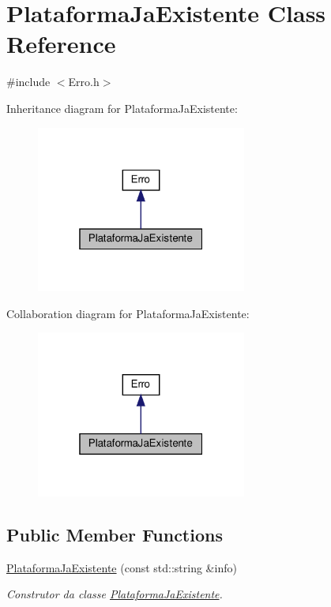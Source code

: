 \hypertarget{classPlataformaJaExistente}{}\section{Plataforma\+Ja\+Existente Class Reference}
\label{classPlataformaJaExistente}


{\ttfamily \#include $<$Erro.\+h$>$}



Inheritance diagram for Plataforma\+Ja\+Existente\+:
\nopagebreak
\begin{figure}[H]
\begin{center}
\leavevmode
\includegraphics[width=196pt]{classPlataformaJaExistente__inherit__graph}
\end{center}
\end{figure}


Collaboration diagram for Plataforma\+Ja\+Existente\+:
\nopagebreak
\begin{figure}[H]
\begin{center}
\leavevmode
\includegraphics[width=196pt]{classPlataformaJaExistente__coll__graph}
\end{center}
\end{figure}
\subsection*{Public Member Functions}
\begin{DoxyCompactItemize}
\item 
\hyperlink{classPlataformaJaExistente_a471bf73973470d778c2442a8adc17e89}{Plataforma\+Ja\+Existente} (const std\+::string \&info)
\begin{DoxyCompactList}\small\item\em Construtor da classe \hyperlink{classPlataformaJaExistente}{Plataforma\+Ja\+Existente}. \end{DoxyCompactList}\end{DoxyCompactItemize}


